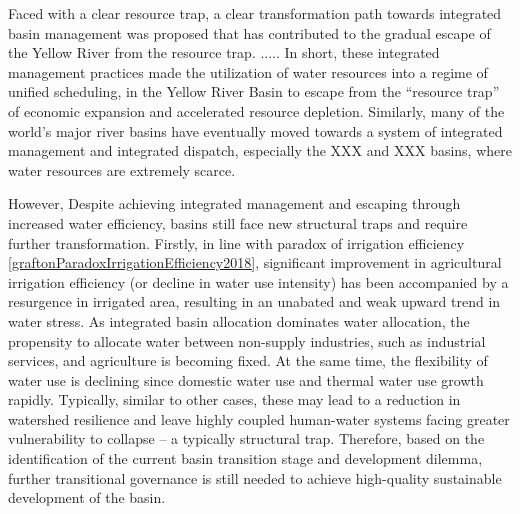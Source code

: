 \documentclass[9pt, twocolumn, twoside, lineno]{pnas-new}
\begin{document}
Faced with a clear resource trap, a clear transformation path towards integrated basin management was proposed
that has contributed to the gradual escape of the Yellow River from the resource trap.
.....
In short, these integrated management practices made the utilization of water resources into a regime of unified scheduling, 
in the Yellow River Basin 
to escape from the “resource trap” of economic expansion and accelerated resource depletion.
Similarly, 
many of the world's major river basins have eventually moved towards a system of integrated management and integrated dispatch, 
especially the XXX and XXX basins, 
where water resources are extremely scarce.


However, Despite achieving integrated management and escaping through increased water efficiency, 
basins still face new structural traps and require further transformation.
Firstly, in line with paradox of irrigation efficiency \ref{graftonParadoxIrrigationEfficiency2018}, 
significant improvement in agricultural irrigation efficiency (or decline in water use intensity) 
has been accompanied by a resurgence in irrigated area, 
resulting in an unabated and weak upward trend in water stress.
As integrated basin allocation dominates water allocation, 
the propensity to allocate water between non-supply industries, such as industrial services, 
and agriculture is becoming fixed.
At the same time, the flexibility of water use is declining since domestic water use and thermal water use growth rapidly. 
Typically, similar to other cases, these may lead to a reduction in watershed resilience 
and leave highly coupled human-water systems facing greater vulnerability to collapse 
-- a typically structural trap.
Therefore, based on the identification of the current basin transition stage and development dilemma, 
further transitional governance is still needed to achieve high-quality sustainable development of the basin.
\end{document}
